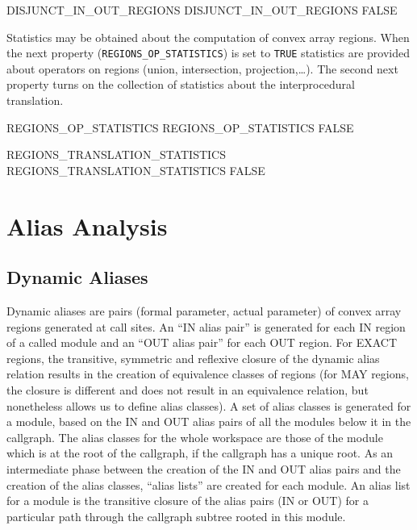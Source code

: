 \documentclass[a4paper]{report}
\begin{document}
\begin{PipsProp}{DISJUNCT_IN_OUT_REGIONS}
DISJUNCT_IN_OUT_REGIONS FALSE
\end{PipsProp}

Statistics may be obtained about the computation of convex array
regions. When the next
property ({\tt REGIONS\_OP\_STATISTICS}) is set to {\tt TRUE} statistics are
provided about operators on regions (union, intersection,
projection,\dots). The second next property turns on the collection of
statistics about the interprocedural translation.

\begin{PipsProp}{REGIONS_OP_STATISTICS}
REGIONS_OP_STATISTICS FALSE
\end{PipsProp}

\begin{PipsProp}{REGIONS_TRANSLATION_STATISTICS}
REGIONS_TRANSLATION_STATISTICS FALSE
\end{PipsProp}



\section{Alias Analysis}
\label{subsection-alias-analysis}

\subsection{Dynamic Aliases}
\label{subsubsection-dynamic-aliases}

Dynamic aliases are pairs (formal parameter, actual parameter) of
convex array regions
generated at call sites. An ``IN alias pair'' is generated for each IN
region of
a called module and an ``OUT alias pair'' for each OUT region. For EXACT
regions, the transitive, symmetric and reflexive closure of the dynamic
alias relation results in the creation of equivalence classes of regions
(for MAY regions, the closure is different and does not
result in an equivalence relation, but nonetheless allows us to define alias
classes). A set of alias
classes is generated for a module, based on the IN and OUT alias
pairs of all the modules below it in the callgraph. The alias classes for
the whole workspace are those of the module which is at the root of the
callgraph, if the callgraph has a unique root. As an intermediate phase
between the creation of the
IN and OUT alias pairs and the creation of the alias classes, ``alias
lists'' are created for each module. An alias list for a module is the
transitive closure of the alias pairs (IN or OUT) for a particular path
through the callgraph subtree rooted in this module.
\end{document}
